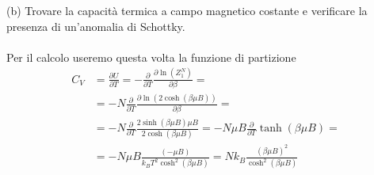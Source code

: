 \documentclass[a4paper]{article}
\begin{document}
        (b) Trovare la capacità termica a campo magnetico costante e verificare la presenza di un'anomalia di Schottky.
        \\
        \\
        Per il calcolo useremo questa volta la funzione di partizione
        \begin{equation*}
            \begin{split}
                C_V&=\frac{\partial U}{\partial T}=-\frac{\partial}{\partial T}\frac{\partial \ln(Z_1^N)}{\partial \beta}=\\
                &=-N\frac{\partial}{\partial T}\frac{\partial \ln(2\cosh(\beta\mu B))}{\partial \beta}=\\
                &=-N\frac{\partial}{\partial T}\frac{2\sinh(\beta\mu B)\mu B}{2\cosh(\beta\mu B)}=-N\mu B\frac{\partial}{\partial T}\tanh(\beta\mu B)=\\
                &=-N\mu B\frac{(-\mu B)}{k_BT^2\cosh^2(\beta\mu B)}=Nk_B\frac{(\beta\mu B)^2}{\cosh^2(\beta\mu B)}\\
            \end{split}
        \end{equation*}
        \begin{center}
        \end{center}
    
\end{document}
